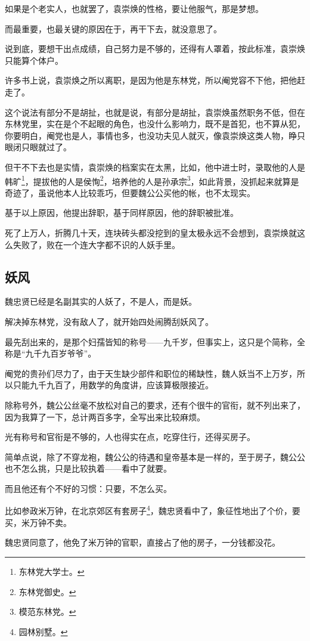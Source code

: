 \begin{multicols}{\theparacolNo}
如果是个老实人，也就罢了，袁崇焕的性格，要让他服气，那是梦想。

而最重要，也最关键的原因在于，再干下去，就没意思了。

说到底，要想干出点成绩，自己努力是不够的，还得有人罩着，按此标准，袁崇焕只能算个体户。

许多书上说，袁崇焕之所以离职，是因为他是东林党，所以阉党容不下他，把他赶走了。

这个说法有部分不是胡扯，也就是说，有部分是胡扯，袁崇焕虽然职务不低，但在东林党里，实在是个不起眼的角色，也没什么影响力，既不是首犯，也不算从犯，你要明白，阉党也是人，事情也多，也没功夫见人就灭，像袁崇焕这类人物，睁只眼闭只眼就过了。

但干不下去也是实情，袁崇焕的档案实在太黑，比如，他中进士时，录取他的人是韩旷\footnote{东林党大学士。}，提拔他的人是侯恂\footnote{东林党御史。}，培养他的人是孙承宗\footnote{模范东林党。}，如此背景，没抓起来就算是奇迹了，虽说他本人比较乖巧，但要魏公公买他的帐，也不太现实。

基于以上原因，他提出辞职，基于同样原因，他的辞职被批准。

死了上万人，折腾几十天，连块砖头都没挖到的皇太极永远不会想到，袁崇焕就这么失败了，败在一个连大字都不识的人妖手里。

\subsection{妖风}
魏忠贤已经是名副其实的人妖了，不是人，而是妖。

解决掉东林党，没有敌人了，就开始四处闹腾刮妖风了。

最先刮出来的，是那个妇孺皆知的称号——九千岁，但事实上，这只是个简称，全称是“九千九百岁爷爷”。

阉党的贵孙们尽力了，由于天生缺少部件和职位的稀缺性，魏人妖当不上万岁，所以只能九千九百了，用数学的角度讲，应该算极限接近。

除称号外，魏公公丝毫不放松对自己的要求，还有个很牛的官衔，就不列出来了，因为我算了一下，总计两百多字，全写出来比较麻烦。

光有称号和官衔是不够的，人也得实在点，吃穿住行，还得买房子。

简单点说，除了不穿龙袍，魏公公的待遇和皇帝基本是一样的，至于房子，魏公公也不怎么挑，只是比较执着——看中了就要。

而且他还有个不好的习惯：只要，不怎么买。

比如参政米万钟，在北京郊区有套房子\footnote{园林别墅。}，魏忠贤看中了，象征性地出了个价，要买，米万钟不卖。

魏忠贤同意了，他免了米万钟的官职，直接占了他的房子，一分钱都没花。


\end{multicols}
